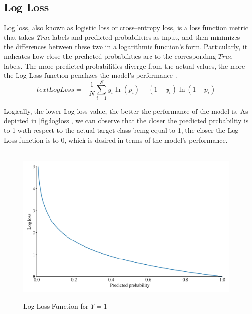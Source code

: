 \newpage
\subsection{Log Loss}
\label{subsubsec:logloss}

Log loss, also known as logistic loss or cross--entropy loss, is a loss function metric that takes \textit{True} labels and predicted probabilities as input, and then minimizes the differences between these two in a logarithmic function's form.
Particularly, it indicates how close the predicted probabilities are to the corresponding $True$ labels. The more predicted probabilities diverge from the actual values, the more the Log Loss function penalizes the model's performance \citep{dembla2020intuition}.
\begin{equation}\label{eq}
text{Log Loss} = -\frac{1}{N} \sum_{i=1}^{N} y_i \ln(p_i) + (1-y_i)\ln(1-p_i)
\end{equation}



Logically, the lower Log loss value, the better the performance of the model is. As depicted in \autoref{fig:logloss}, we can observe that the closer the predicted probability is to 1 with respect to the actual target class being equal to 1, the closer the Log Loss function is to 0, which is desired in terms of the model's performance.
\begin{figure}[H]
    \centering
    \caption{Log Loss Function for $Y=1$}\vspace{0.5em}
    \label{fig:logloss}\
    \includegraphics[width=130mm]{Figures/logloss.jpg}
    \vspace{-1em}
\end{figure}


